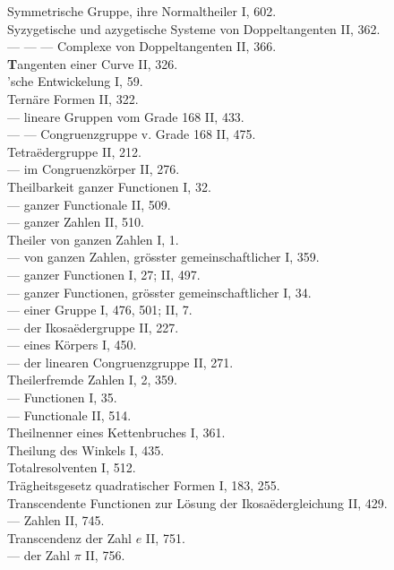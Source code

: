 \begin{flushleft}
Symmetrische Gruppe, ihre Normaltheiler I, 602. \\
Syzygetische und azygetische Systeme von Doppeltangenten II, 362. \\
— — — Complexe von Doppeltangenten II, 366. \\[6pt]
\textbf{T}angenten einer Curve II, 326. \\
'sche Entwickelung I, 59. \\
Ternäre Formen II, 322. \\
— lineare Gruppen vom Grade 168 II, 433. \\
— — Congruenzgruppe v. Grade 168 II, 475. \\
Tetra\"edergruppe II, 212. \\
— im Congruenzk\"orper II, 276. \\
Theilbarkeit ganzer Functionen I, 32. \\
— ganzer Functionale II, 509. \\
— ganzer Zahlen II, 510. \\
Theiler von ganzen Zahlen I, 1. \\
— von ganzen Zahlen, gr\"osster gemeinschaftlicher I, 359. \\
— ganzer Functionen I, 27; II, 497. \\
— ganzer Functionen, gr\"osster gemeinschaftlicher I, 34. \\
— einer Gruppe I, 476, 501; II, 7. \\
— der Ikosa\"edergruppe II, 227. \\
— eines K\"orpers I, 450. \\
— der linearen Congruenzgruppe II, 271. \\
Theilerfremde Zahlen I, 2, 359. \\
— Functionen I, 35. \\
— Functionale II, 514. \\
Theilnenner eines Kettenbruches I, 361. \\
Theilung des Winkels I, 435. \\
Totalresolventen I, 512. \\
Tr\"agheitsgesetz quadratischer Formen I, 183, 255. \\
Transcendente Functionen zur L\"osung der Ikosa\"edergleichung II, 429. \\
— Zahlen II, 745. \\
Transcendenz der Zahl $e$ II, 751. \\
— der Zahl $\pi$ II, 756. \\

\end{flushleft}

